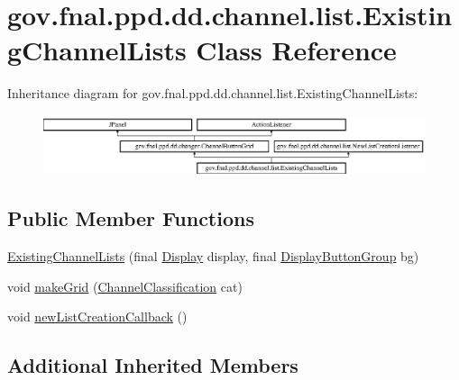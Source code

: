 \hypertarget{classgov_1_1fnal_1_1ppd_1_1dd_1_1channel_1_1list_1_1ExistingChannelLists}{\section{gov.\-fnal.\-ppd.\-dd.\-channel.\-list.\-Existing\-Channel\-Lists Class Reference}
\label{classgov_1_1fnal_1_1ppd_1_1dd_1_1channel_1_1list_1_1ExistingChannelLists}
}
Inheritance diagram for gov.\-fnal.\-ppd.\-dd.\-channel.\-list.\-Existing\-Channel\-Lists\-:\begin{figure}[H]
\begin{center}
\leavevmode
\includegraphics[height=1.761006cm]{classgov_1_1fnal_1_1ppd_1_1dd_1_1channel_1_1list_1_1ExistingChannelLists}
\end{center}
\end{figure}
\subsection*{Public Member Functions}
\begin{DoxyCompactItemize}
\item 
\hyperlink{classgov_1_1fnal_1_1ppd_1_1dd_1_1channel_1_1list_1_1ExistingChannelLists_a70f446df6a0fcf3cea1e0d524aea2192}{Existing\-Channel\-Lists} (final \hyperlink{interfacegov_1_1fnal_1_1ppd_1_1dd_1_1signage_1_1Display}{Display} display, final \hyperlink{classgov_1_1fnal_1_1ppd_1_1dd_1_1util_1_1DisplayButtonGroup}{Display\-Button\-Group} bg)
\item 
void \hyperlink{classgov_1_1fnal_1_1ppd_1_1dd_1_1channel_1_1list_1_1ExistingChannelLists_affca544ad4b4775e0b36334e75595c77}{make\-Grid} (\hyperlink{classgov_1_1fnal_1_1ppd_1_1dd_1_1changer_1_1ChannelClassification}{Channel\-Classification} cat)
\item 
void \hyperlink{classgov_1_1fnal_1_1ppd_1_1dd_1_1channel_1_1list_1_1ExistingChannelLists_a1cedfe917a325659dfa082f83c9cef96}{new\-List\-Creation\-Callback} ()
\end{DoxyCompactItemize}
\subsection*{Additional Inherited Members}


